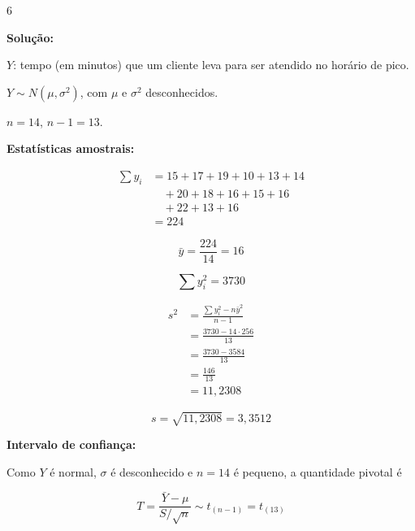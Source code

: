\documentclass[8pt, a4paper, landscape]{extarticle}
\begin{document}
\begin{multicols}{6}
\vspace{0.3cm}

\textbf{Solução:}

$Y$: tempo (em minutos) que um cliente leva para ser atendido no horário de pico.

$Y \sim N(\mu, \sigma^2)$, com $\mu$ e $\sigma^2$ desconhecidos.

$n = 14$, \quad $n - 1 = 13$.

\vspace{0.2cm}

\textbf{Estatísticas amostrais:}

\begin{equation*}
\begin{split}
\sum y_i &= 15+17+19+10+13+14 \\
&\quad +20+18+16+15+16 \\
&\quad +22+13+16 \\
&= 224
\end{split}
\end{equation*}

\begin{equation*}
\bar{y} = \frac{224}{14} = 16
\end{equation*}

\begin{equation*}
\sum y_i^2 = 3730
\end{equation*}

\begin{equation*}
\begin{split}
s^2 &= \frac{\sum y_i^2 - n\bar{y}^2}{n-1} \\
&= \frac{3730 - 14 \cdot 256}{13} \\
&= \frac{3730 - 3584}{13} \\
&= \frac{146}{13} \\
&= 11,2308
\end{split}
\end{equation*}

\begin{equation*}
s = \sqrt{11,2308} = 3,3512
\end{equation*}

\vspace{0.2cm}

\textbf{Intervalo de confiança:}

Como $Y$ é normal, $\sigma$ é desconhecido e $n = 14$ é pequeno, a quantidade pivotal é

\begin{equation*}
T = \frac{\bar{Y} - \mu}{S/\sqrt{n}} \sim t_{(n-1)} = t_{(13)}
\end{equation*}


\end{multicols}
\end{document}

